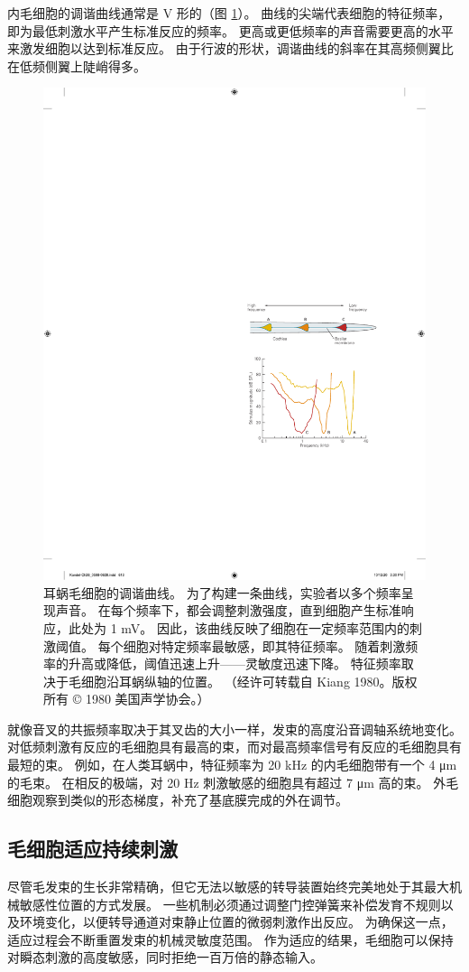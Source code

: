 内毛细胞的调谐曲线通常是 V 形的（图 \ref{fig:26_11}）。 
曲线的尖端代表细胞的特征频率，即为最低刺激水平产生标准反应的频率。 更高或更低频率的声音需要更高的水平来激发细胞以达到标准反应。 由于行波的形状，调谐曲线的斜率在其高频侧翼比在低频侧翼上陡峭得多。

\begin{figure}[htbp]
	\centering
	\includegraphics[width=0.5\linewidth]{chap26/fig_26_11}
	\caption{耳蜗毛细胞的调谐曲线。 为了构建一条曲线，实验者以多个频率呈现声音。 在每个频率下，都会调整刺激强度，直到细胞产生标准响应，此处为 1 mV。 因此，该曲线反映了细胞在一定频率范围内的刺激阈值。 每个细胞对特定频率最敏感，即其特征频率。 随着刺激频率的升高或降低，阈值迅速上升——灵敏度迅速下降。 特征频率取决于毛细胞沿耳蜗纵轴的位置。 （经许可转载自 Kiang 1980。版权所有 © 1980 美国声学协会。）}
	\label{fig:26_11}
\end{figure}

就像音叉的共振频率取决于其叉齿的大小一样，发束的高度沿音调轴系统地变化。 对低频刺激有反应的毛细胞具有最高的束，而对最高频率信号有反应的毛细胞具有最短的束。 例如，在人类耳蜗中，特征频率为 20 kHz 的内毛细胞带有一个 4 μm 的毛束。 在相反的极端，对 20 Hz 刺激敏感的细胞具有超过 7 μm 高的束。 外毛细胞观察到类似的形态梯度，补充了基底膜完成的外在调节。

\subsection{毛细胞适应持续刺激}
尽管毛发束的生长非常精确，但它无法以敏感的转导装置始终完美地处于其最大机械敏感性位置的方式发展。 一些机制必须通过调整门控弹簧来补偿发育不规则以及环境变化，以便转导通道对束静止位置的微弱刺激作出反应。 为确保这一点，适应过程会不断重置发束的机械灵敏度范围。 作为适应的结果，毛细胞可以保持对瞬态刺激的高度敏感，同时拒绝一百万倍的静态输入。

